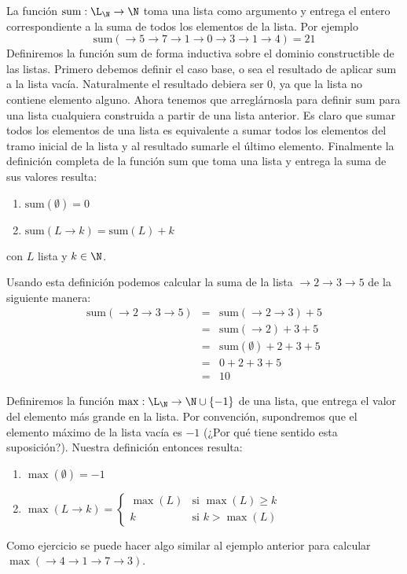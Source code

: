 \begin{ejemplo}
La función $\text{sum}:\L_\N\rightarrow\N$ toma una lista como argumento y entrega el entero correspondiente a la suma de todos los elementos de la lista.
Por ejemplo
\[
\text{sum}(\rightarrow 5\rightarrow 7\rightarrow 1\rightarrow 0\rightarrow 3\rightarrow 1\rightarrow 4)=21
\]
Definiremos la función $\text{sum}$ de forma inductiva sobre el dominio constructible de las listas.
Primero debemos definir el caso base, o sea el resultado de aplicar $\text{sum}$ a la lista vacía.
Naturalmente el resultado debiera ser $0$, ya que la lista no contiene elemento alguno.
Ahora tenemos que arreglárnosla para definir $\text{sum}$ para una lista cualquiera construida a partir de una lista anterior.
Es claro que sumar todos los elementos de una lista es equivalente a sumar todos los elementos del tramo inicial de la lista y al resultado sumarle el último elemento.
Finalmente la definición completa de la función $\text{sum}$ que toma una lista y entrega la suma de sus valores resulta:
\begin{enumerate}
\itemsep 0pt
\item $\text{sum}(\emptyset)=0$
\item $\text{sum}(L\rightarrow k)=\text{sum}(L)+k$
\end{enumerate}
con $L$ lista y $k\in\N$.

Usando esta definición podemos calcular la suma de la lista $\rightarrow 2\rightarrow 3\rightarrow 5$ de la siguiente manera:
\[
\begin{array}{rcl}
\text{sum}(\rightarrow 2\rightarrow 3\rightarrow 5) & = & \text{sum}(\rightarrow 2\rightarrow 3) + 5 \\
& = & \text{sum}(\rightarrow 2) + 3 + 5\\
& = & \text{sum}(\emptyset) + 2 + 3 + 5\\
& = & 0 + 2+ 3 + 5\\
& = & 10
\end{array}
\]
\end{ejemplo}

\begin{ejemplo}
Definiremos la función $\max:\L_\N\rightarrow\N\cup\{-1\}$ de una lista, que entrega el valor del elemento más grande en la lista.
Por convención, supondremos que el elemento máximo de la lista vacía es $-1$ (¿Por qué tiene sentido esta suposición?).
Nuestra definición entonces resulta:
\begin{enumerate}
\itemsep 0pt
\item $\max(\emptyset)=-1$
\item $
\max(L\rightarrow k)=\left\{
\begin{array}{cl}
\max(L) & \text{si }\max(L)\geq k \\
k & \text{si }k>\max(L)
\end{array}\right.
$
\end{enumerate}
Como ejercicio se puede hacer algo similar al ejemplo anterior para calcular $\max(\rightarrow 4\rightarrow 1\rightarrow 7\rightarrow 3)$.
\end{ejemplo}

